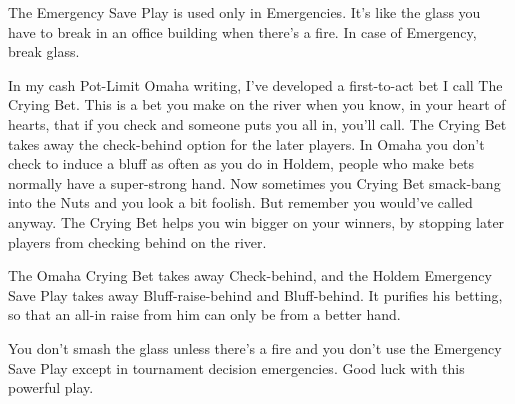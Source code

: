 The Emergency Save Play is used only in Emergencies. It's like the
glass you have to break in an office building when there's a fire. In
case of Emergency, break glass.

In my cash Pot-Limit Omaha writing, I've developed a first-to-act bet
I call The Crying Bet. This is a bet you make on the river when you
know, in your heart of hearts, that if you check and someone puts you
all in, you'll call. The Crying Bet takes away the check-behind option
for the later players. In Omaha you don't check to induce a bluff as
often as you do in Holdem, people who make bets normally have a
super-strong hand. Now sometimes you Crying Bet smack-bang into the
Nuts and you look a bit foolish. But remember you would've called
anyway. The Crying Bet helps you win bigger on your winners, by
stopping later players from checking behind on the river.

The Omaha Crying Bet takes away Check-behind, and the Holdem
Emergency Save Play takes away Bluff-raise-behind and Bluff-behind. It
purifies his betting, so that an all-in raise from him can only be
from a better hand.

You don't smash the glass unless there's a fire and you don't use the
Emergency Save Play except in tournament decision emergencies. Good
luck with this powerful play.
